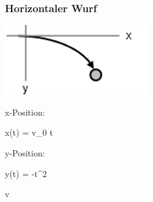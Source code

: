 \subsubsection{Horizontaler Wurf }
\begin{minipage}{\textwidth}	
	\begin{minipage}{0.2\textwidth}
		\includegraphics[width=\columnwidth]{./Images/HoriWurf.png}
	\end{minipage}%
	\begin{minipage}{0.25\textwidth}	
		x-Position:
		\begin{formula}
			{x(t) = v_0 \cdot t} 
		\end{formula}
		
		y-Position:
		\begin{formula}
			{y(t) = -\frac{g}{2}t^2}
		\end{formula}	
	\end{minipage}
\end{minipage}
v
